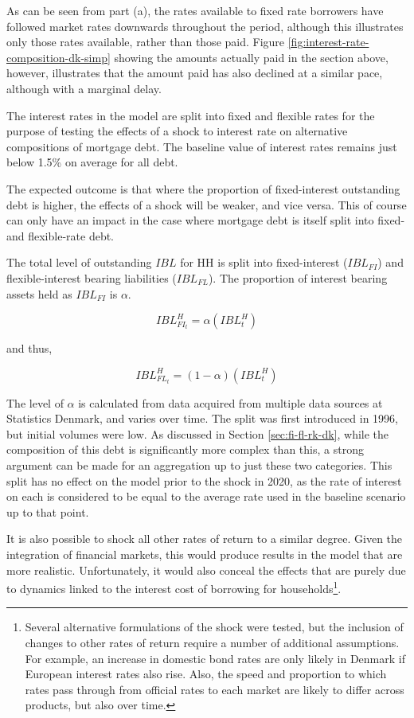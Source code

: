 \documentclass[
]{book}
\begin{document}
As can be seen from part (a), the rates available to fixed rate borrowers have followed market rates downwards throughout the period, although this illustrates only those rates available, rather than those paid. Figure \ref{fig:interest-rate-composition-dk-simp} showing the amounts actually paid in the section above, however, illustrates that the amount paid has also declined at a similar pace, although with a marginal delay.

The interest rates in the model are split into fixed and flexible rates for the purpose of
testing the effects of a shock to interest rate on alternative compositions of mortgage debt.
The baseline value of interest rates remains just below 1.5\% on average for all debt.

The expected outcome is that where the proportion of fixed-interest outstanding debt is higher, the effects of a shock will be weaker, and vice versa. This of course can only have an impact in the case where mortgage debt is itself split into fixed- and flexible-rate debt.

The total level of outstanding \(IBL\) for HH is split into fixed-interest (\(IBL_{FI}\)) and flexible-interest bearing liabilities (\(IBL_{FL}\)). The proportion of interest bearing assets held as \(IBL_{FI}\) is \(\alpha\).

\begin{equation}
IBL^H_{{FI}_t} = \alpha(IBL^H_t)
\end{equation}

and thus,

\begin{equation}
IBL^H_{{FL}_t} = (1-\alpha)(IBL^H_t)
\end{equation}

The level of \(\alpha\) is calculated from data acquired from multiple data sources at Statistics Denmark, and varies over time. The split was first introduced in 1996, but initial volumes were low. As discussed in Section \ref{sec:fi-fl-rk-dk}, while the composition of this debt is significantly more complex than this, a strong argument can be made for an aggregation up to just these two categories. This split has no effect on the model prior to the shock in 2020, as the rate of interest on each is considered to be equal to the average rate used in the baseline scenario up to that point.

It is also possible to shock all other rates of return to a similar degree. Given the integration of financial markets, this would produce results in the model that are more realistic. Unfortunately, it would also conceal the effects that are purely due to dynamics linked to the interest cost of borrowing for households\footnote{Several alternative formulations of the shock were tested, but the inclusion of changes to other rates of return require a number of additional assumptions. For example, an increase in domestic bond rates are only likely in Denmark if European interest rates also rise. Also, the speed and proportion to which rates pass through from official rates to each market are likely to differ across products, but also over time.}.
\end{document}
